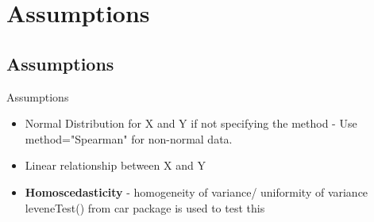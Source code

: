 \documentclass[slidestop,compress,14pt,xcolor=dvipsnames]{beamer}\usepackage[]{graphicx}\usepackage[]{color}
\begin{document}
\section{Assumptions}
\subsection{Assumptions}
\begin{frame}{Assumptions}
\begin{itemize}
    \item Normal Distribution for X and Y if not specifying the method - Use method="Spearman" for non-normal data.
    \item Linear relationship between X and Y
    \item {\bf Homoscedasticity} - homogeneity of variance/ uniformity of variance 
    leveneTest() from car package is used to test this
\end{itemize}
\end{frame}
\end{document}
